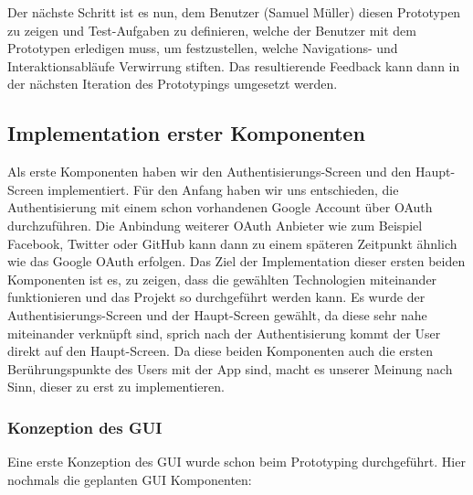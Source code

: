 Der nächste Schritt ist es nun, dem Benutzer (Samuel Müller) diesen Prototypen zu zeigen und Test-Aufgaben zu definieren, welche der Benutzer mit dem Prototypen erledigen muss, um festzustellen, welche Navigations- und Interaktionsabläufe Verwirrung stiften. Das resultierende Feedback kann dann in der nächsten Iteration des Prototypings umgesetzt werden.

\subsection{Implementation erster Komponenten}
Als erste Komponenten haben wir den Authentisierungs-Screen und den Haupt-Screen implementiert. Für den Anfang haben wir uns entschieden, die Authentisierung mit einem schon vorhandenen Google Account über OAuth durchzuführen. Die Anbindung weiterer OAuth Anbieter wie zum Beispiel Facebook, Twitter oder GitHub kann dann zu einem späteren Zeitpunkt ähnlich wie das Google OAuth erfolgen. 
\newline
Das Ziel der Implementation dieser ersten beiden Komponenten ist es, zu zeigen, dass die gewählten Technologien miteinander funktionieren und das Projekt so durchgeführt werden kann. Es wurde der Authentisierungs-Screen und der Haupt-Screen gewählt, da diese sehr nahe miteinander verknüpft sind, sprich nach der Authentisierung kommt der User direkt auf den Haupt-Screen. Da diese beiden Komponenten auch die ersten Berührungspunkte des Users mit der App sind, macht es unserer Meinung nach Sinn, dieser zu erst zu implementieren.

\subsubsection{Konzeption des GUI}
Eine erste Konzeption des GUI wurde schon beim Prototyping durchgeführt. Hier nochmals die geplanten GUI Komponenten:

